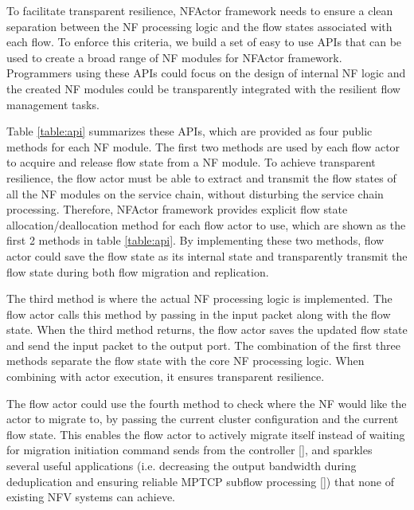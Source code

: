 To facilitate transparent resilience, NFActor framework needs to ensure a clean separation between the NF processing logic and the flow states associated with each flow. To enforce this criteria, we build a set of easy to use APIs that can be used to create a broad range of NF modules for NFActor framework. Programmers using these APIs could focus on the design of internal NF logic and the created NF modules could be transparently integrated with the resilient flow management tasks.

Table \ref{table:api} summarizes these APIs, which are provided as four public methods for each NF module. The first two methods are used by each flow actor to acquire and release flow state from a NF module. To achieve transparent resilience, the flow actor must be able to extract and transmit the flow states of all the NF modules on the service chain, without disturbing the service chain processing. Therefore, NFActor framework provides explicit flow state allocation/deallocation method for each flow actor to use, which are shown as the first 2 methods in table \ref{table:api}. By implementing these two methods, flow actor could save the flow state as its internal state and transparently transmit the flow state during both flow migration and replication.

The third method is where the actual NF processing logic is implemented. The flow actor calls this method by passing in the input packet along with the flow state. When the third method returns, the flow actor saves the updated flow state and send the input packet to the output port. The combination of the first three methods separate the flow state with the core NF processing logic. When combining with actor execution, it ensures transparent resilience.

The flow actor could use the fourth method to check where the NF would like the actor to migrate to, by passing the current cluster configuration and the current flow state. This enables the flow actor to actively migrate itself instead of waiting for migration initiation command sends from the controller \ref{}, and sparkles several useful applications (i.e. decreasing the output bandwidth during deduplication and ensuring reliable MPTCP subflow processing \ref{}) that none of existing NFV systems can achieve.
